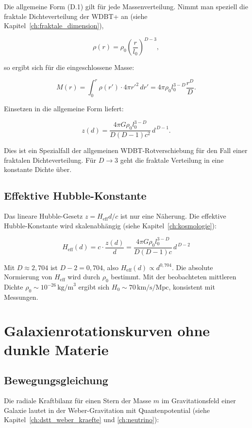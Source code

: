 Die allgemeine Form (D.1) gilt für jede Massenverteilung. Nimmt man speziell die fraktale Dichteverteilung der WDBT+ an (siehe Kapitel~\ref{ch:fraktale_dimension}),

\[
\rho(r) = \rho_0 \left( \frac{r}{l_0} \right)^{D-3}, \tag{D.2}
\]

so ergibt sich für die eingeschlossene Masse:

\[
M(r) = \int_0^r \rho(r') \cdot 4\pi r'^2 \, dr' = 4\pi \rho_0 l_0^{3-D} \frac{r^D}{D}. \tag{D.3}
\]

Einsetzen in die allgemeine Form liefert:

\[
z(d) = \frac{4\pi G \rho_0 l_0^{3-D}}{D(D-1)c^2} \, d^{\,D-1}. \tag{D.4}
\]

Dies ist ein Spezialfall der allgemeinen WDBT-Rotverschiebung für den Fall einer fraktalen Dichteverteilung. Für \( D \to 3 \) geht die fraktale Verteilung in eine konstante Dichte über.

\subsection{Effektive Hubble-Konstante}
\label{sub:herleitungen_rot_hubble}

Das lineare Hubble-Gesetz \( z = H_{\text{eff}} d / c \) ist nur eine Näherung. Die effektive Hubble-Konstante wird skalenabhängig (siehe Kapitel~\ref{ch:kosmologie}):

\[
H_{\text{eff}}(d) = c \cdot \frac{z(d)}{d} = \frac{4\pi G \rho_0 l_0^{3-D}}{D(D-1)c} \, d^{\,D-2} \tag{D.5}
\]

Mit \( D \approx 2,704 \) ist \( D-2 = 0,704 \), also \( H_{\text{eff}}(d) \propto d^{0,704} \). Die absolute Normierung von \( H_{\text{eff}} \) wird durch \( \rho_0 \) bestimmt. Mit der beobachteten mittleren Dichte \( \rho_0 \sim 10^{-26} \, \text{kg/m}^3 \) ergibt sich \( H_0 \sim 70 \, \text{km/s/Mpc} \), konsistent mit Messungen.

\section{Galaxienrotationskurven ohne dunkle Materie}
\label{app:herleitungen_rotation}

\subsection{Bewegungsgleichung}
\label{sub:herleitungen_rot_bewegung}

Die radiale Kraftbilanz für einen Stern der Masse \( m \) im Gravitationsfeld einer Galaxie lautet in der Weber-Gravitation mit Quantenpotential (siehe Kapitel~\ref{ch:dstt_weber_kraefte} und \ref{ch:neutrino}):

